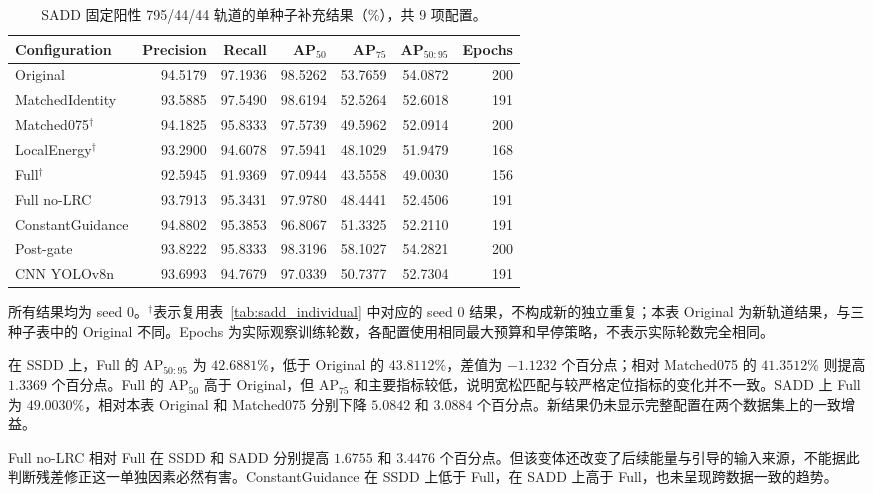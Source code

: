 \documentclass[journal]{IEEEtran}
\begin{document}
\begin{table}[!t]
\centering
\small
\setlength{\tabcolsep}{3pt}
\caption{SADD 固定阳性 795/44/44 轨道的单种子补充结果（\%），共 9 项配置。}
\label{tab:sadd_seed0_controls}
\begin{tabular*}{\textwidth}{@{\extracolsep{\fill}}lrrrrrr}
\toprule
Configuration & Precision & Recall & AP$_{50}$ & AP$_{75}$ & AP$_{50:95}$ & Epochs \\
\midrule
Original
& 94.5179 & 97.1936 & 98.5262 & 53.7659 & 54.0872 & 200 \\
MatchedIdentity
& 93.5885 & 97.5490 & 98.6194 & 52.5264 & 52.6018 & 191 \\
Matched075$^{\dagger}$
& 94.1825 & 95.8333 & 97.5739 & 49.5962 & 52.0914 & 200 \\
LocalEnergy$^{\dagger}$
& 93.2900 & 94.6078 & 97.5941 & 48.1029 & 51.9479 & 168 \\
Full$^{\dagger}$
& 92.5945 & 91.9369 & 97.0944 & 43.5558 & 49.0030 & 156 \\
Full no-LRC
& 93.7913 & 95.3431 & 97.9780 & 48.4441 & 52.4506 & 191 \\
ConstantGuidance
& 94.8802 & 95.3853 & 96.8067 & 51.3325 & 52.2110 & 191 \\
Post-gate
& 93.8222 & 95.8333 & 98.3196 & 58.1027 & 54.2821 & 200 \\
CNN YOLOv8n
& 93.6993 & 94.7679 & 97.0339 & 50.7377 & 52.7304 & 191 \\
\bottomrule
\end{tabular*}
\smallskip
\begin{minipage}{\linewidth}
\footnotesize
所有结果均为 seed 0。$^{\dagger}$表示复用表~\ref{tab:sadd_individual} 中对应的 seed 0 结果，不构成新的独立重复；本表 Original 为新轨道结果，与三种子表中的 Original 不同。Epochs 为实际观察训练轮数，各配置使用相同最大预算和早停策略，不表示实际轮数完全相同。
\end{minipage}
\end{table}

在 SSDD 上，Full 的 $\mathrm{AP}_{50:95}$ 为 $42.6881\%$，低于 Original 的 $43.8112\%$，差值为 $-1.1232$ 个百分点；相对 Matched075 的 $41.3512\%$ 则提高 $1.3369$ 个百分点。Full 的 $\mathrm{AP}_{50}$ 高于 Original，但 $\mathrm{AP}_{75}$ 和主要指标较低，说明宽松匹配与较严格定位指标的变化并不一致。SADD 上 Full 为 $49.0030\%$，相对本表 Original 和 Matched075 分别下降 $5.0842$ 和 $3.0884$ 个百分点。新结果仍未显示完整配置在两个数据集上的一致增益。

Full no-LRC 相对 Full 在 SSDD 和 SADD 分别提高 $1.6755$ 和 $3.4476$ 个百分点。但该变体还改变了后续能量与引导的输入来源，不能据此判断残差修正这一单独因素必然有害。ConstantGuidance 在 SSDD 上低于 Full，在 SADD 上高于 Full，也未呈现跨数据一致的趋势。
\end{document}
